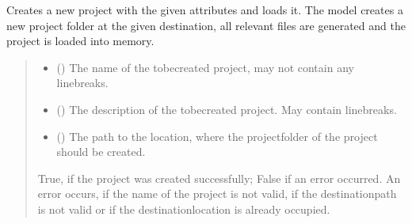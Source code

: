\documentclass[letterpaper,10pt,english]{sphinxmanual}
\begin{document}
\begin{fulllineitems}
\begin{fulllineitems}
\label{\detokenize{apidoc/src.osm_configurator.control:src.osm_configurator.control.control.Control.create_project}}
\pysigstartsignatures
{}
\pysigstopsignatures
\sphinxAtStartPar
Creates a new project with the given attributes and loads it.
The model creates a new project folder at the given destination, all relevant files are generated and the project is loaded into memory.
\begin{quote}\begin{description}
\begin{itemize}
\item {} 
\sphinxAtStartPar
{} () \textendash{} The name of the to\sphinxhyphen{}be\sphinxhyphen{}created project, may not contain any line\sphinxhyphen{}breaks.

\item {} 
\sphinxAtStartPar
{} () \textendash{} The description of the to\sphinxhyphen{}be\sphinxhyphen{}created project. May contain line\sphinxhyphen{}breaks.

\item {} 
\sphinxAtStartPar
{} () \textendash{} The path to the location, where the project\sphinxhyphen{}folder of the project should be created.

\end{itemize}

\sphinxAtStartPar
True, if the project was created successfully; False if an error occurred. An error occurs, if the name of the project is not valid, if the destination\sphinxhyphen{}path is not valid or if the destination\sphinxhyphen{}location is already occupied.

\sphinxAtStartPar
{}


\end{description}
\end{quote}
\end{fulllineitems}
\end{fulllineitems}
\end{document}
